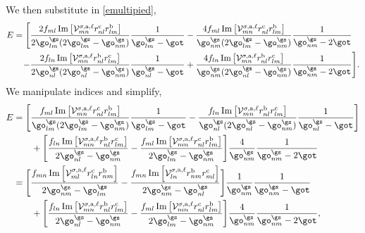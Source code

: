We then substitute in \eqref{emultipied},
\begin{align*}
E =  
\Bigg[
  \frac{2f_{ml}\,\mathrm{Im}\left[\mathcal{V}^{\sigma,\text{a},\ell}_{mn}
        r^{\text{c}}_{nl}
        r^{\text{b}}_{lm}\right]}
        {2\go^\gs_{lm}(2\go^\gs_{lm}-\go^\gs_{nm})}
\frac{1}{\go^\gs_{lm}-\got}
&-\frac{4f_{ml}\,\mathrm{Im}\left[\mathcal{V}^{\sigma,\text{a},\ell}_{mn}
        r^{\text{c}}_{nl}
        r^{\text{b}}_{lm}\right]}
        {\go^\gs_{nm}(2\go^\gs_{lm}-\go^\gs_{nm})}
\frac{1}{\go^\gs_{nm}-2\got}\nonumber\\
-\frac{2f_{ln}\,\mathrm{Im}\left[\mathcal{V}^{\sigma,\text{a},\ell}_{mn}
        r^{\text{b}}_{nl}
        r^{\text{c}}_{lm}\right]}
        {2\go^\gs_{nl}(2\go^\gs_{nl}-\go^\gs_{nm})}
\frac{1}{\go^\gs_{nl}-\got}
&+\frac{4f_{ln}\,\mathrm{Im}\left[\mathcal{V}^{\sigma,\text{a},\ell}_{mn}
        r^{\text{b}}_{nl}
        r^{\text{c}}_{lm}\right]}
        {\go^\gs_{nm}(2\go^\gs_{nl}-\go^\gs_{nm})}
\frac{1}{\go^\gs_{nm}-2\got}
\Bigg]
.
\end{align*}
We manipulate indices and simplify,
\begin{align*}
E &=  
\Bigg[
  \frac{f_{ml}\,\mathrm{Im}\left[\mathcal{V}^{\sigma,\text{a},\ell}_{mn}
        r^{\text{c}}_{nl}
        r^{\text{b}}_{lm}\right]}
        {\go^\gs_{lm}(2\go^\gs_{lm}-\go^\gs_{nm})}
\frac{1}{\go^\gs_{lm}-\got}
 -\frac{f_{ln}\,\mathrm{Im}\left[\mathcal{V}^{\sigma,\text{a},\ell}_{mn}
        r^{\text{b}}_{nl}
        r^{\text{c}}_{lm}\right]}
        {\go^\gs_{nl}(2\go^\gs_{nl}-\go^\gs_{nm})}
\frac{1}{\go^\gs_{nl}-\got}
\Bigg]\nonumber\\
&\qquad+
\Bigg[
  \frac{f_{ln}\,\mathrm{Im}\left[\mathcal{V}^{\sigma,\text{a},\ell}_{mn}
        r^{\text{b}}_{nl}
        r^{\text{c}}_{lm}\right]}
        {2\go^\gs_{nl}-\go^\gs_{nm}}
 -\frac{f_{ml}\,\mathrm{Im}\left[\mathcal{V}^{\sigma,\text{a},\ell}_{mn}
        r^{\text{c}}_{nl}
        r^{\text{b}}_{lm}\right]}
        {2\go^\gs_{lm}-\go^\gs_{nm}}
\Bigg]\frac{4}{\go^\gs_{nm}}\frac{1}{\go^\gs_{nm}-2\got}\nonumber\\
&=  
\Bigg[
  \frac{f_{mn}\,\mathrm{Im}\left[\mathcal{V}^{\sigma,\text{a},\ell}_{ml}
        r^{\text{c}}_{ln}
        r^{\text{b}}_{nm}\right]}
        {2\go^\gs_{nm}-\go^\gs_{lm}}
 -\frac{f_{mn}\,\mathrm{Im}\left[\mathcal{V}^{\sigma,\text{a},\ell}_{ln}
        r^{\text{b}}_{nm}
        r^{\text{c}}_{ml}\right]}
        {2\go^\gs_{nm}-\go^\gs_{nl}}
\Bigg]\frac{1}{\go^\gs_{nm}}\frac{1}{\go^\gs_{nm}-\got}\nonumber\\
&\qquad+
\Bigg[
  \frac{f_{ln}\,\mathrm{Im}\left[\mathcal{V}^{\sigma,\text{a},\ell}_{mn}
        r^{\text{b}}_{nl}
        r^{\text{c}}_{lm}\right]}
        {2\go^\gs_{nl}-\go^\gs_{nm}}
 -\frac{f_{ml}\,\mathrm{Im}\left[\mathcal{V}^{\sigma,\text{a},\ell}_{mn}
        r^{\text{c}}_{nl}
        r^{\text{b}}_{lm}\right]}
        {2\go^\gs_{lm}-\go^\gs_{nm}}
\Bigg]\frac{4}{\go^\gs_{nm}}\frac{1}{\go^\gs_{nm}-2\got}
,
\end{align*}
